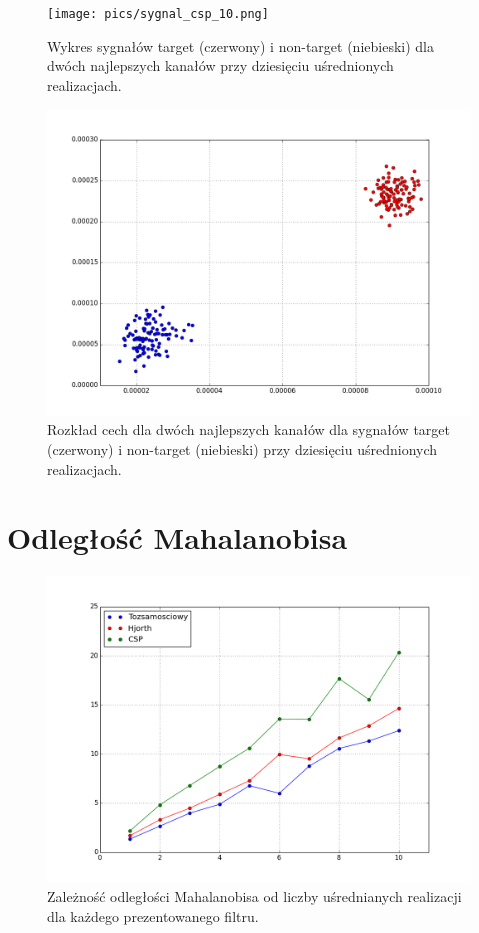 \documentclass[licencjacka,openright]{pracamgr}
\begin{document}
\begin{figure}[H]
\centering
\texttt{[image: pics/sygnal\_csp\_10.png]}
\caption{Wykres sygnałów target (czerwony) i non-target (niebieski) dla dwóch najlepszych kanałów przy dziesięciu uśrednionych realizacjach.}
\label{sygnal_csp_10}
\end{figure}

\begin{figure}[H]
\centering
\includegraphics[scale=0.55, trim=0mm 0mm 0mm 0mm, clip=True]{pics/cecha_csp_10.png}
\caption{Rozkład cech dla dwóch najlepszych kanałów dla sygnałów target (czerwony) i non-target (niebieski) przy dziesięciu uśrednionych realizacjach.}
\label{cecha_csp_10}
\end{figure}


\section{Odległość Mahalanobisa}
\begin{figure}[H]
\centering
\includegraphics[scale=0.37, trim=57mm 30mm 30mm 15mm, clip=True]{pics/mahalanobis.png}
\caption{Zależność odległości Mahalanobisa od liczby uśrednianych realizacji dla każdego prezentowanego filtru.}
\label{mahalanobis_pic}
\end{figure}
\end{document}
